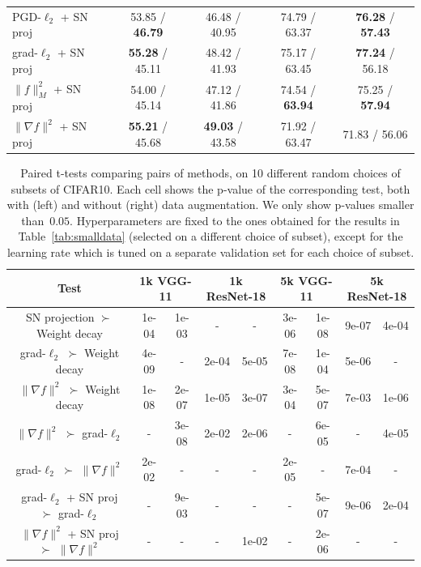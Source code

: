 \begin{table}[h]
\begin{tabular}{ | l | c | c | c | c |  }
PGD-$\ell_2$ + SN proj & 53.85 / \textbf{46.79} & 46.48 / 40.95 & 74.79 / 63.37 & \textbf{\color{darkgray}76.28} / \textbf{\color{darkgray}57.43} \\
grad-$\ell_2$ + SN proj & \textbf{\color{darkgray}55.28} / 45.11 & 48.42 / 41.93 & 75.17 / 63.45 & \textbf{77.24} / 56.18 \\
$\|f\|_M^2$ + SN proj & 54.00 / 45.14 & 47.12 / 41.86 & 74.54 / \textbf{63.94} & 75.25 / \textbf{57.94} \\
$\|\nabla f\|^2$ + SN proj & \textbf{\color{darkgray}55.21} / 45.68 & \textbf{49.03} / 43.58 & 71.92 / 63.47 & 71.83 / 56.06 \\
\hline
\end{tabular}
\end{table}


\begin{table}[h]
\caption{Paired t-tests comparing pairs of methods, on 10 different random choices of subsets of CIFAR10.
Each cell shows the p-value of the corresponding test, both with (left) and without (right) data augmentation.
We only show p-values smaller than~$0.05$.
Hyperparameters are fixed to the ones obtained for the results in Table~\ref{tab:smalldata}
(selected on a different choice of subset), except for the learning rate which is tuned on
a separate validation set for each choice of subset.}
\centering
\label{tab:t_test}
\vspace{0.2cm}
\begin{tabular}{ | c | c c | c c | c c | c c |  }
\hline
Test & \multicolumn{2}{|c|}{1k VGG-11} & \multicolumn{2}{|c|}{1k ResNet-18} & \multicolumn{2}{|c|}{5k VGG-11} & \multicolumn{2}{|c|}{5k ResNet-18} \\ \hline
\hline
SN projection $\succ$ Weight decay & 1e-04 & 1e-03 & - & - & 3e-06 & 1e-08 & 9e-07 & 4e-04\\ \hline
grad-$\ell_2$ $\succ$ Weight decay & 4e-09 & - & 2e-04 & 5e-05 & 7e-08 & 1e-04 & 5e-06 & -\\ \hline
$\|\nabla f\|^2$ $\succ$ Weight decay & 1e-08 & 2e-07 & 1e-05 & 3e-07 & 3e-04 & 5e-07 & 7e-03 & 1e-06\\ \hline
$\|\nabla f\|^2$ $\succ$ grad-$\ell_2$ & - & 3e-08 & 2e-02 & 2e-06 & - & 6e-05 & - & 4e-05\\ \hline
grad-$\ell_2$ $\succ$ $\|\nabla f\|^2$ & 2e-02 & - & - & - & 2e-05 & - & 7e-04 & -\\ \hline
grad-$\ell_2$ + SN proj $\succ$ grad-$\ell_2$ & - & 9e-03 & - & - & - & 5e-07 & 9e-06 & 2e-04\\ \hline
$\|\nabla f\|^2$ + SN proj $\succ$ $\|\nabla f\|^2$ & - & - & - & 1e-02 & - & 2e-06 & - & -\\ \hline
\end{tabular}
\end{table}


